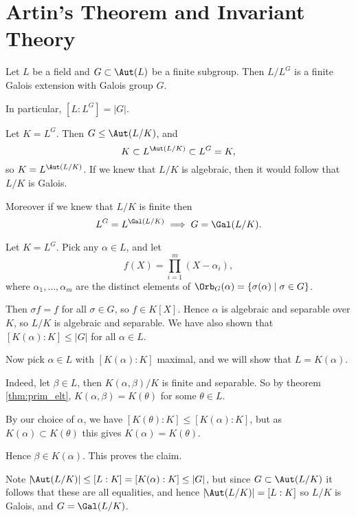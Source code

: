 \documentclass[12pt]{article}
\begin{document}
\newpage

\section{Artin's Theorem and Invariant Theory}
\label{sec:art_thm}

\begin{theorem}
	Let $L$ be a field and $G \subset \Aut(L)$ be a finite subgroup. Then $L/L^G$ is a finite Galois extension with Galois group $G$.

	In particular, $[L:L^G] = |G|$.
\end{theorem}

\begin{remark}
	Let $K = L^G$. Then $G \leq \Aut(L/K)$, and
	\[
	K \subset L^{\Aut(L/K)} \subset L^G = K,
	\]
	so $K = L^{\Aut(L/K)}$. If we knew that $L/K$ is algebraic, then it would follow that $L/K$ is Galois.

	Moreover if we knew that $L/K$ is finite then
	\[
	L^G = L^{\Gal(L/K)} \implies G = \Gal(L/K).
	\]
\end{remark}

\begin{proofbox}
	Let $K = L^G$. Pick any $\alpha \in L$, and let
	\[
	f(X) = \prod_{i = 1}^{m} (X - \alpha_i),
	\]
	where $\alpha_1, \ldots, \alpha_m$ are the distinct elements of $\Orb_G(\alpha) = \{\sigma(\alpha) \mid \sigma \in G\}$.

	Then $\sigma f = f$ for all $\sigma \in G$, so $f \in K[X]$. Hence $\alpha$ is algebraic and separable over $K$, so $L/K$ is algebraic and separable. We have also shown that $[K(\alpha) : K] \leq |G|$ for all $\alpha \in L$.

	Now pick $\alpha \in L$ with $[K(\alpha):K]$ maximal, and we will show that $L = K(\alpha)$.

	Indeed, let $\beta \in L$, then $K(\alpha, \beta)/K$ is finite and separable. So by theorem \ref{thm:prim_elt}, $K(\alpha, \beta) = K(\theta)$ for some $\theta \in L$.

	By our choice of $\alpha$, we have $[K(\theta) : K] \leq [K(\alpha) : K]$, but as $K(\alpha) \subset K(\theta)$ this gives $K(\alpha) = K(\theta)$.

	Hence $\beta \in K(\alpha)$. This proves the claim.

	Note $|\!\Aut(L/K)| \leq [L:K] = [K(\alpha) : K] \leq |G|$, but since $G \subset \Aut(L/K)$ it follows that these are all equalities, and hence $|\!\Aut(L/K)| = [L:K]$ so $L/K$ is Galois, and $G = \Gal(L/K)$.
\end{proofbox}
\end{document}
